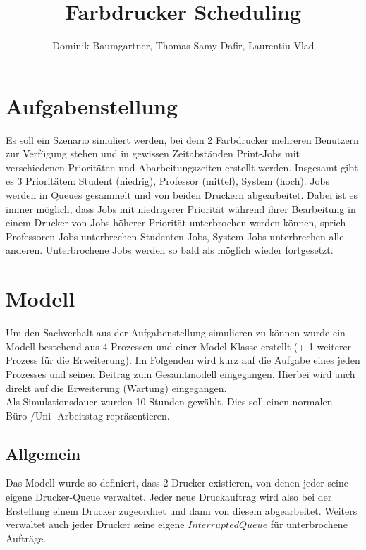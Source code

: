 \documentclass[12pt,a4paper]{article}
\title{Farbdrucker Scheduling}
\author{Dominik Baumgartner, Thomas Samy Dafir, Laurentiu Vlad}
\date{}
\begin{document}
	\maketitle
	
	\section{Aufgabenstellung}
	Es soll ein Szenario simuliert werden, bei dem 2 Farbdrucker mehreren Benutzern zur Verfügung stehen und in gewissen Zeitabständen Print-Jobs mit
	verschiedenen Prioritäten und Abarbeitungszeiten erstellt werden. Insgesamt gibt es 3 Prioritäten: Student (niedrig), Professor (mittel), System (hoch). Jobs
	werden in Queues gesammelt und von beiden Druckern abgearbeitet. Dabei ist es immer möglich, dass Jobs mit niedrigerer Priorität während ihrer Bearbeitung in 
	einem Drucker von Jobs höherer Priorität unterbrochen werden können, sprich Professoren-Jobs unterbrechen Studenten-Jobs, System-Jobs unterbrechen alle 
	anderen. Unterbrochene Jobs werden so bald als möglich wieder fortgesetzt.
	
	\section{Modell}
	Um den Sachverhalt aus der Aufgabenstellung simulieren zu können wurde ein Modell bestehend aus 4 Prozessen und einer Model-Klasse erstellt (+ 1 weiterer Prozess für die Erweiterung).
	Im Folgenden wird kurz auf die Aufgabe eines jeden Prozesses und seinen Beitrag zum Gesamtmodell eingegangen. Hierbei wird auch direkt auf die Erweiterung (Wartung) eingegangen. \\
	Als Simulationsdauer wurden 10 Stunden gewählt. Dies soll einen normalen Büro-/Uni- Arbeitstag repräsentieren.
	
	\subsection{Allgemein}
	Das Modell wurde so definiert, dass 2 Drucker existieren, von denen jeder seine eigene Drucker-Queue verwaltet. Jeder neue Druckauftrag wird also bei der Erstellung einem Drucker zugeordnet
	und dann von diesem abgearbeitet. Weiters verwaltet auch jeder Drucker seine eigene $InterruptedQueue$ für unterbrochene Aufträge.
	
\end{document}

